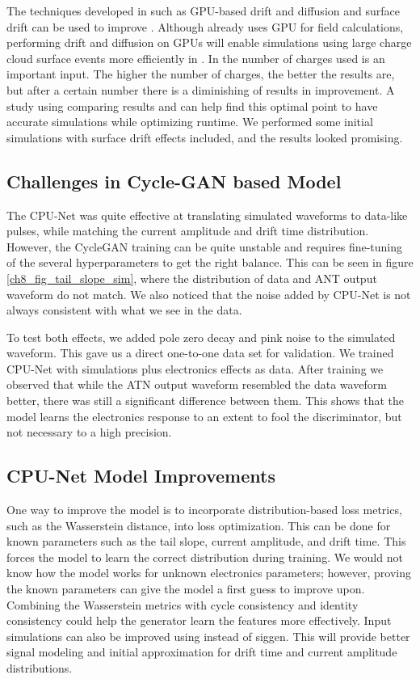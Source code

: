 The techniques developed in {\ehd} such as GPU-based drift and diffusion and surface drift can be used to improve {\ssd}. Although {\ssd} already uses GPU for field calculations, performing drift and diffusion on GPUs will enable simulations using large charge cloud surface events more efficiently in {\ssd}. In {\ssd} the number of charges used is an important input. The higher the number of charges, the better the results are, but after a certain number there is a diminishing of results in improvement. A study using comparing {\ehd} results and {\ssd} can help find this optimal point to have accurate simulations while optimizing runtime. We performed some initial {\ssd} simulations with surface drift effects included, and the results looked promising.

\subsection{Challenges in Cycle-GAN based Model}
The CPU-Net was quite effective at translating simulated waveforms to data-like pulses, while matching the current amplitude and drift time distribution. However, the CycleGAN training can be quite unstable and requires fine-tuning of the several hyperparameters to get the right balance. This can be seen in figure \ref{ch8_fig_tail_slope_sim}, where the distribution of data and ANT output waveform do not match. We also noticed that the noise added by CPU-Net is not always consistent with what we see in the data. 

To test both effects, we added pole zero decay and pink noise to the simulated waveform. This gave us a direct one-to-one data set for validation. We trained CPU-Net with simulations plus electronics effects as data. After training we observed that while the ATN output waveform resembled the data waveform better, there was still a significant difference between them. This shows that the model learns the electronics response to an extent to fool the discriminator, but not necessary to a high precision. 

\subsection{CPU-Net Model Improvements}
One way to improve the model is to incorporate distribution-based loss metrics, such as the Wasserstein distance, into loss optimization. This can be done for known parameters such as the tail slope, current amplitude, and drift time. This forces the model to learn the correct distribution during training. We would not know how the model works for unknown electronics parameters; however, proving the known parameters can give the model a first guess to improve upon. Combining the Wasserstein metrics with cycle consistency and identity consistency could help the generator learn the features more effectively. Input simulations can also be improved using {\ssd} instead of siggen. This will provide better signal modeling and initial approximation for drift time and current amplitude distributions.

